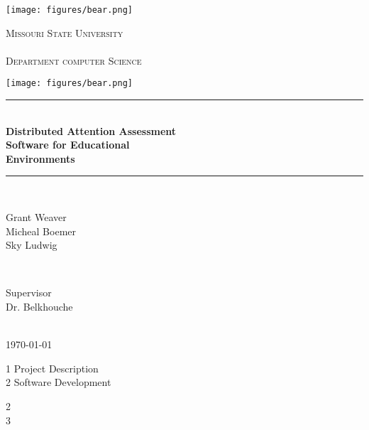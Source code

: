 \documentclass[12pt]{article}
\begin{document}
\begin{titlepage}

\newcommand{\HRule}{\rule{\linewidth}{0.5mm}} 

\begin{minipage}[b]{0.12\textwidth}
\texttt{[image: figures/bear.png]}
\end{minipage}
\begin{minipage}[b]{0.72\textwidth}
\centering
\textsc{\LARGE Missouri State University\\~\\Department computer Science}
\end{minipage}
\begin{minipage}[b]{0.12\textwidth}
\texttt{[image: figures/bear.png]}
\end{minipage}
\vspace{1.0cm}
\center
\HRule \\[0.4cm]
{ \huge \bfseries Distributed Attention Assessment\\ Software for Educational\\[0.4cm] Environments}\\[0.4cm] 
\HRule \\[1.5cm]


\begin{minipage}{0.4\textwidth}
\begin{flushleft} \large
Grant Weaver \\ Micheal Boemer \\ Sky Ludwig 
\end{flushleft}
\end{minipage}
~
\begin{minipage}{0.4\textwidth}
\begin{flushright} \large
Supervisor \\ 
Dr. Belkhouche
\end{flushright}
\end{minipage}\\[2cm]

{\large \today}\\[2cm] 

\end{titlepage}

\newpage
\tableofcontents
\begin{minipage}{0.4\textwidth}
\begin{flushleft} \large
1   Project Description \\ 2    Software Development
\end{flushleft}
\end{minipage}
\begin{minipage}{0.4\textwidth}
\begin{flushright} \large
2 \\ 3
\end{flushright}
\end{minipage}\\
\newpage
\end{document}
